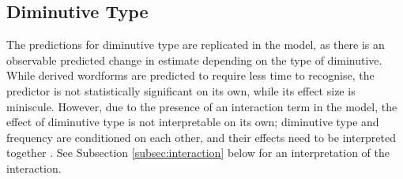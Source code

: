 \begin{table}[h]
\centering
\label{tab:reg-fixed}
\caption[Summary of fixed effects from the experimental model]{Summary of fixed effects from the experimental model. All continuous predictors centered and standardised, categorical predictor \textit{Diminutive Type} sum-coded, predictors the effects of which have achieved significance (\textit{p}<0.05) have their \textit{p}-values in boldface.}
\end{table}

\subsection{Diminutive Type} \label{subsec:dimtype}
The predictions for diminutive type are replicated in the model, as there is an observable predicted change in estimate depending on the type of diminutive. While derived wordforms are predicted to require less time to recognise, the predictor is not statistically significant on its own, while its effect size is miniscule. However, due to the presence of an interaction term in the model, the effect of diminutive type is not interpretable on its own; diminutive type and frequency are conditioned on each other, and their effects need to be interpreted together \parencite{Winter+2019}. See Subsection \ref{subsec:interaction} below for an interpretation of the interaction.
